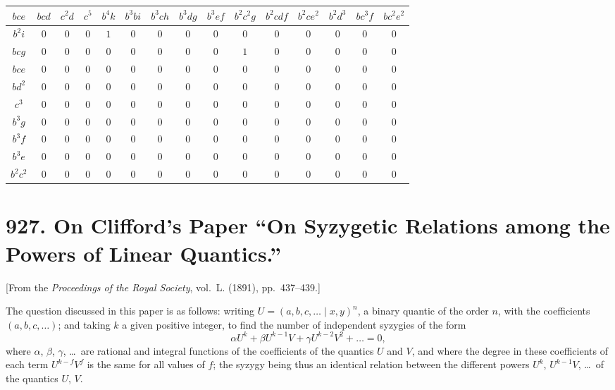 \documentclass[12pt,a4paper]{article}
\begin{document}
\begin{longtable}{|c|c|c|c|c|c|c|c|c|c|c|c|c|c|c|}
\hline
$bce$ & $bcd$ & $c^2d$ & $c^5$ & $b^4k$ & $b^3bi$ & $b^3ch$ & $b^3dg$ & $b^3ef$ & $b^2c^2g$ & $b^2cdf$ & $b^2ce^2$ & $b^2d^3$ & $bc^3f$ & $bc^2e^2$\\
\hline
\endhead
$b^2i$ & $0$ & $0$ & $0$ & $1$ & $0$ & $0$ & $0$ & $0$ & $0$ & $0$ & $0$ & $0$ & $0$ & $0$\\
$bcg$ & $0$ & $0$ & $0$ & $0$ & $0$ & $0$ & $0$ & $0$ & $1$ & $0$ & $0$ & $0$ & $0$ & $0$\\
$bce$ & $0$ & $0$ & $0$ & $0$ & $0$ & $0$ & $0$ & $0$ & $0$ & $0$ & $0$ & $0$ & $0$ & $0$\\
$bd^2$ & $0$ & $0$ & $0$ & $0$ & $0$ & $0$ & $0$ & $0$ & $0$ & $0$ & $0$ & $0$ & $0$ & $0$\\
$c^3$ & $0$ & $0$ & $0$ & $0$ & $0$ & $0$ & $0$ & $0$ & $0$ & $0$ & $0$ & $0$ & $0$ & $0$\\
$b^3g$ & $0$ & $0$ & $0$ & $0$ & $0$ & $0$ & $0$ & $0$ & $0$ & $0$ & $0$ & $0$ & $0$ & $0$\\
$b^3f$ & $0$ & $0$ & $0$ & $0$ & $0$ & $0$ & $0$ & $0$ & $0$ & $0$ & $0$ & $0$ & $0$ & $0$\\
$b^3e$ & $0$ & $0$ & $0$ & $0$ & $0$ & $0$ & $0$ & $0$ & $0$ & $0$ & $0$ & $0$ & $0$ & $0$\\
$b^2c^2$ & $0$ & $0$ & $0$ & $0$ & $0$ & $0$ & $0$ & $0$ & $0$ & $0$ & $0$ & $0$ & $0$ & $0$\\
\hline
\end{longtable}



\newpage
\section*{927. On Clifford's Paper ``On Syzygetic Relations among the Powers of Linear Quantics.''}

[From the \textit{Proceedings of the Royal Society}, vol.~L. (1891), pp.~437--439.]

\bigskip

The question discussed in this paper is as follows: writing $U = (a, b, c, \ldots \mid x, y)^n$,
a binary quantic of the order $n$, with the coefficients $(a, b, c, \ldots)$; and taking $k$ a given
positive integer, to find the number of independent syzygies of the form
\[
\alpha U^k + \beta U^{k-1}V + \gamma U^{k-2}V^2 + \ldots = 0,
\]
where $\alpha$, $\beta$, $\gamma$, \ldots\ are rational and integral functions of the coefficients of the
quantics $U$ and $V$, and where the degree in these coefficients of each term $U^{k-f}V^f$
is the same for all values of $f$; the syzygy being thus an identical relation between
the different powers $U^k$, $U^{k-1}V$, \ldots\ of the quantics $U$, $V$.
\end{document}
